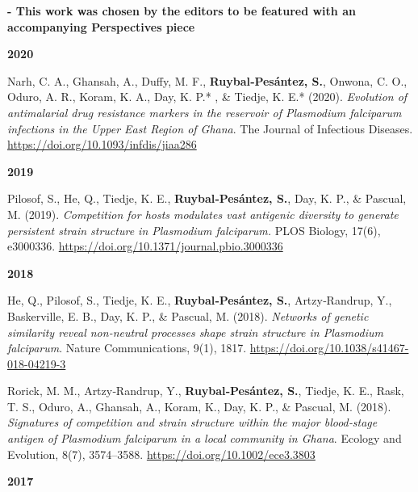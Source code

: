 \documentclass[11pt,a4paper,]{awesome-cv}
\begin{document}
\setlength{\leftskip}{2cm}

\textbf{- This work was chosen by the editors to be featured with an
accompanying Perspectives piece
\href{https://doi.org/10.1371/journal.pgen.1009344}{\faExternalLink}}

\setlength{\leftskip}{0cm}

\textbf{2020}

\setlength{\leftskip}{1cm}

Narh, C. A., Ghansah, A., Duffy, M. F., \textbf{Ruybal‐Pesántez, S.},
Onwona, C. O., Oduro, A. R., Koram, K. A., Day, K. P.* , \& Tiedje, K.
E.* (2020). \emph{Evolution of antimalarial drug resistance markers in
the reservoir of Plasmodium falciparum infections in the Upper East
Region of Ghana}. The Journal of Infectious Diseases.
\url{https://doi.org/10.1093/infdis/jiaa286}

\setlength{\leftskip}{0cm}

\textbf{2019}

\setlength{\leftskip}{1cm}

Pilosof, S., He, Q., Tiedje, K. E., \textbf{Ruybal‐Pesántez, S.}, Day,
K. P., \& Pascual, M. (2019). \emph{Competition for hosts modulates vast
antigenic diversity to generate persistent strain structure in
Plasmodium falciparum.} PLOS Biology, 17(6), e3000336.
\url{https://doi.org/10.1371/journal.pbio.3000336}

\setlength{\leftskip}{0cm}

\textbf{2018}

\setlength{\leftskip}{1cm}

He, Q., Pilosof, S., Tiedje, K. E., \textbf{Ruybal‐Pesántez, S.},
Artzy‐Randrup, Y., Baskerville, E. B., Day, K. P., \& Pascual, M.
(2018). \emph{Networks of genetic similarity reveal non‐neutral
processes shape strain structure in Plasmodium falciparum}. Nature
Communications, 9(1), 1817.
\url{https://doi.org/10.1038/s41467-018-04219-3}

Rorick, M. M., Artzy‐Randrup, Y., \textbf{Ruybal‐Pesántez, S.}, Tiedje,
K. E., Rask, T. S., Oduro, A., Ghansah, A., Koram, K., Day, K. P., \&
Pascual, M. (2018). \emph{Signatures of competition and strain structure
within the major blood‐stage antigen of Plasmodium falciparum in a local
community in Ghana}. Ecology and Evolution, 8(7), 3574--3588.
\url{https://doi.org/10.1002/ece3.3803}

\setlength{\leftskip}{0cm}

\textbf{2017}

\setlength{\leftskip}{1cm}
\end{document}
